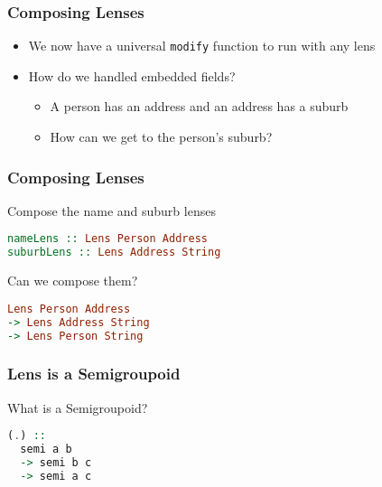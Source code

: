 \begin{frame}[fragile]
\frametitle{Composing Lenses}

\begin{itemize}
\item We now have a universal \lstinline[language=haskell]$modify$ function to run with any lens
\item How do we handled embedded fields?
  \begin{itemize}
  \item A person has an address and an address has a suburb
  \item How can we get to the person's suburb?
  \end{itemize}
\end{itemize}

\end{frame}

\begin{frame}[fragile]
\frametitle{Composing Lenses}

\begin{block}{Compose the name and suburb lenses}
\begin{lstlisting}[language=haskell]
nameLens :: Lens Person Address
suburbLens :: Lens Address String
\end{lstlisting}
\end{block}

\begin{block}{Can we compose them?}
\begin{lstlisting}[language=haskell]
Lens Person Address
-> Lens Address String
-> Lens Person String
\end{lstlisting}
\end{block}

\end{frame}

\begin{frame}[fragile]
\frametitle{Lens is a Semigroupoid}

\begin{block}{What is a Semigroupoid?}
\begin{lstlisting}[language=haskell]
(.) ::
  semi a b
  -> semi b c
  -> semi a c
\end{lstlisting}

\end{block}

\end{frame}

